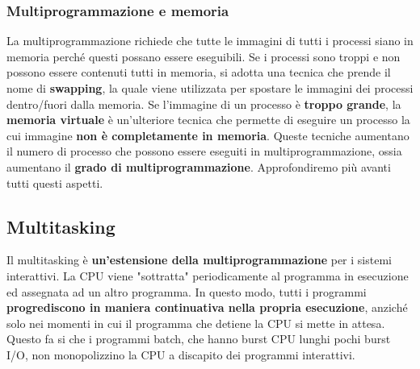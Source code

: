 \documentclass[12pt]{article}
\begin{document}
\subsubsection{Multiprogrammazione e memoria}
La multiprogrammazione richiede che tutte le immagini di tutti i processi siano in memoria perché questi possano essere eseguibili.
Se i processi sono troppi e non possono essere contenuti tutti in memoria, si adotta una tecnica che prende il nome di \textbf{swapping}, la quale viene utilizzata
per spostare le immagini dei processi dentro/fuori dalla memoria.
Se l'immagine di un processo è \textbf{troppo grande}, la \textbf{memoria virtuale} è un'ulteriore tecnica che permette di eseguire un processo la cui immagine \textbf{non è completamente in memoria}.
Queste tecniche aumentano il numero di processo che possono essere eseguiti in multiprogrammazione, ossia aumentano il \textbf{grado di multiprogrammazione}.
Approfondiremo più avanti tutti questi aspetti.
\subsection{Multitasking}
Il multitasking è \textbf{un'estensione della multiprogrammazione} per i sistemi interattivi.
La CPU viene "sottratta" periodicamente al programma in esecuzione ed assegnata ad un altro programma.
In questo modo, tutti i programmi \textbf{progrediscono in maniera continuativa nella propria esecuzione}, anziché solo
nei momenti in cui il programma che detiene la CPU si mette in attesa.
Questo fa si che i programmi batch, che hanno burst CPU lunghi pochi burst I/O, non monopolizzino la CPU a discapito dei programmi interattivi.
\end{document}
